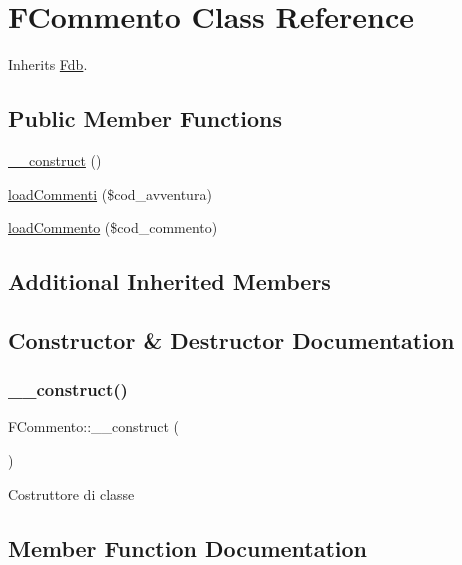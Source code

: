\hypertarget{class_f_commento}{}\section{F\+Commento Class Reference}
\label{class_f_commento}


Inherits \mbox{\hyperlink{class_fdb}{Fdb}}.

\subsection*{Public Member Functions}
\begin{DoxyCompactItemize}
\item 
\mbox{\hyperlink{class_f_commento_a9f5497be71540e6aabb32dc214de2b26}{\+\_\+\+\_\+construct}} ()
\item 
\mbox{\hyperlink{class_f_commento_aa10e3f0355ea0f0a31a14063a4d0318d}{load\+Commenti}} (\$cod\+\_\+avventura)
\item 
\mbox{\hyperlink{class_f_commento_a575ec007020823deec1607b1acdc6d82}{load\+Commento}} (\$cod\+\_\+commento)
\end{DoxyCompactItemize}
\subsection*{Additional Inherited Members}


\subsection{Constructor \& Destructor Documentation}
\mbox{\label{class_f_commento_a9f5497be71540e6aabb32dc214de2b26}} 
\subsubsection{\texorpdfstring{\+\_\+\+\_\+construct()}{\_\_construct()}}
{\footnotesize\ttfamily F\+Commento\+::\+\_\+\+\_\+construct (\begin{DoxyParamCaption}{ }\end{DoxyParamCaption})}

Costruttore di classe 

\subsection{Member Function Documentation}
\mbox{\label{class_f_commento_aa10e3f0355ea0f0a31a14063a4d0318d}} 

